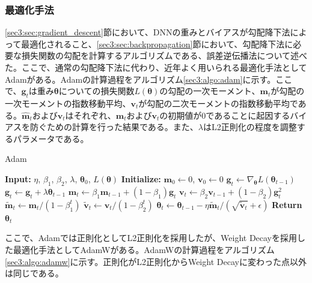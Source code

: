 \documentclass[12pt]{jarticle}
\numberwithin{equation}{section}    %
\numberwithin{figure}{section}      %
\numberwithin{table}{section}      %
\begin{document}
\subsubsection{最適化手法}
\label{sec3:sec:optimizer}
\ref{sec3:sec:gradient_descent}節において、DNNの重みとバイアスが勾配降下法によって最適化されること、\ref{sec3:sec:backpropagation}節において、勾配降下法に必要な損失関数の勾配を計算するアルゴリズムである、誤差逆伝播法について述べた。ここで、通常の勾配降下法に代わり、近年よく用いられる最適化手法としてAdam\cite{kingma2014adam}がある。Adamの計算過程をアルゴリズム\ref{sec3:algo:adam}に示す。ここで、$\bm{g}_{t}$は重み$\bm{\theta}$についての損失関数$L(\bm{\theta})$の勾配の一次モーメント、$\bm{m}_{t}$が勾配の一次モーメントの指数移動平均、$\bm{v}_{t}$が勾配の二次モーメントの指数移動平均である。$\hat{\bm{m}}_{t}$および$\hat{\bm{v}}_{t}$はそれぞれ、$\bm{m}_{t}$および$\bm{v}_{t}$の初期値が0であることに起因するバイアスを防ぐための計算を行った結果である。また、$\lambda$はL2正則化の程度を調整するパラメータである。
\begin{algorithm}
    \caption{Adam}
    \label{sec3:algo:adam}
    \begin{algorithmic}[1]
        \State \textbf{Input:} $\eta$, $\beta_{1}$, $\beta_{2}$, $\lambda$, $\bm{\theta}_{0}$, $L(\bm{\theta})$
        \State \textbf{Initialize:} $\bm{m}_{0} \gets 0$, $\bm{v}_{0} \gets 0$
        \State $\bm{g}_{t} \gets \nabla_{\bm{\theta}} L(\bm{\theta}_{t-1})$
        \State $\bm{g}_t \gets \bm{g}_t + \lambda \bm{\theta}_{t-1}$
        \State $\bm{m}_{t} \gets \beta_{1} \bm{m}_{t-1} + (1 - \beta_{1}) \bm{g}_{t}$
        \State $\bm{v}_{t} \gets \beta_{2} \bm{v}_{t-1} + (1 - \beta_{2}) \bm{g}_{t}^{2}$
        \State $\tilde{\bm{m}}_{t} \gets \bm{m}_{t} / (1 - \beta_{1}^{t})$
        \State $\tilde{\bm{v}}_{t} \gets \bm{v}_{t} / (1 - \beta_{2}^{t})$
        \State $\bm{\theta}_{t} \gets \bm{\theta}_{t-1} - \eta \tilde{\bm{m}}_{t} / (\sqrt{\tilde{\bm{v}}_{t}} + \epsilon)$
        \EndFor
        \State \textbf{Return} $\bm{\theta}_{t}$
    \end{algorithmic}
\end{algorithm}
ここで、Adamでは正則化としてL2正則化を採用したが、Weight Decayを採用した最適化手法としてAdamW\cite{loshchilov2017decoupled}がある。AdamWの計算過程をアルゴリズム\ref{sec3:algo:adamw}に示す。正則化がL2正則化からWeight Decayに変わった点以外は同じである。
\end{document}
